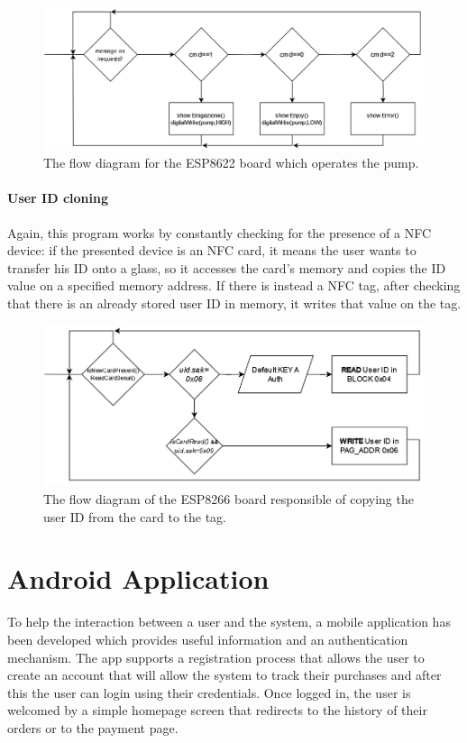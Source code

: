 \documentclass[target=bach,aauheader=,style=]{thud}
\begin{document}
\begin{figure}[h!]
	\centering
	\includegraphics[width=.8\textwidth]{pump_flow}
	\caption{The flow diagram for the ESP8622 board which operates the pump.}
	\label{fig:pump_flow}
\end{figure} 

\subsubsection{User ID cloning}
Again, this program works by constantly checking for the presence of a NFC device: if the presented device is an NFC card, it means the user wants to transfer his ID onto a glass, so it accesses the card's memory and copies the ID value on a specified memory address. If there is instead a NFC tag, after checking that there is an already stored user ID in memory, it writes that value on the tag.

\begin{figure}[h!]
	\centering
	\includegraphics[width=.8\textwidth]{clone_flow}
	\caption{The flow diagram of the ESP8266 board responsible of copying the user ID from the card to the tag.}
	\label{fig:clone_flow}
\end{figure} 




\chapter{Android Application}
To help the interaction between a user and the system, a mobile application has been developed which provides useful information and an authentication mechanism.
The app supports a registration process that allows the user to create an account that will allow the system to track their purchases and after this the user can login using their credentials.
Once logged in, the user is welcomed by a simple homepage screen that redirects to the history of their orders or to the payment page.
\end{document}
